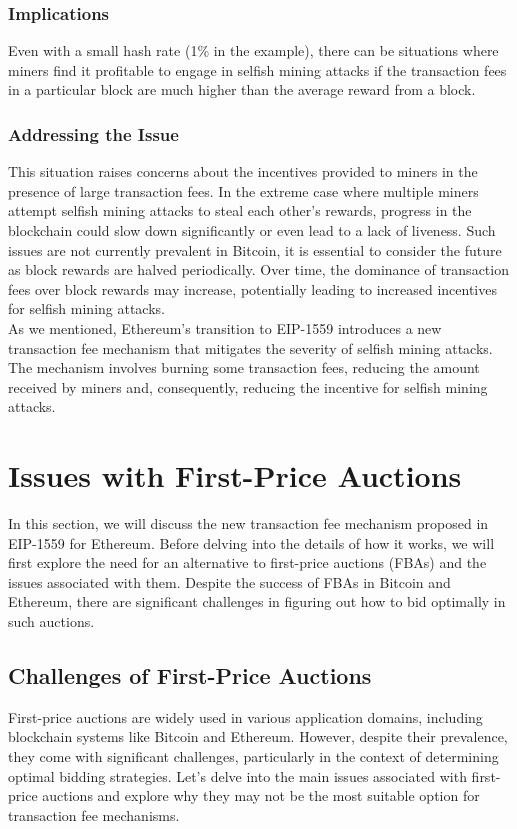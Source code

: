 \subsubsection{Implications}
Even with a small hash rate (1\% in the example), there can be situations where miners find it profitable to engage in selfish mining attacks if the transaction fees in a particular block are much higher than the average reward from a block.

\subsubsection{Addressing the Issue}
This situation raises concerns about the incentives provided to miners in the presence of large transaction fees. In the extreme case where multiple miners attempt selfish mining attacks to steal each other's rewards, progress in the blockchain could slow down significantly or even lead to a lack of liveness. Such issues are not currently prevalent in Bitcoin, it is essential to consider the future as block rewards are halved periodically. Over time, the dominance of transaction fees over block rewards may increase, potentially leading to increased incentives for selfish mining attacks.\\
As we mentioned, Ethereum's transition to EIP-1559 introduces a new transaction fee mechanism that mitigates the severity of selfish mining attacks. The mechanism involves burning some transaction fees, reducing the amount received by miners and, consequently, reducing the incentive for selfish mining attacks.


\section{Issues with First-Price Auctions}
In this section, we will discuss the new transaction fee mechanism proposed in EIP-1559 for Ethereum. Before delving into the details of how it works, we will first explore the need for an alternative to first-price auctions (FBAs) and the issues associated with them. Despite the success of FBAs in Bitcoin and Ethereum, there are significant challenges in figuring out how to bid optimally in such auctions.

\subsection{Challenges of First-Price Auctions}
First-price auctions are widely used in various application domains, including blockchain systems like Bitcoin and Ethereum. However, despite their prevalence, they come with significant challenges, particularly in the context of determining optimal bidding strategies. Let's delve into the main issues associated with first-price auctions and explore why they may not be the most suitable option for transaction fee mechanisms.

